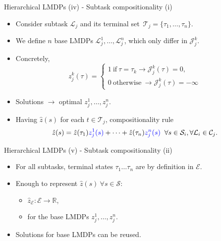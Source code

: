 \documentclass{beamer}
\theoremstyle{mystyle}
\newcommand{\cC}{\mathcal{C}}
\newcommand{\cE}{\mathcal{E}}
\newcommand{\cJ}{\mathcal{J}}
\newcommand{\cL}{\mathcal{L}}
\newcommand{\cS}{\mathcal{S}}
\newcommand{\cT}{\mathcal{T}}
\begin{document}
\begin{frame}{Hierarchical LMDPs (iv) - Subtask compositionality (i)}

\begin{itemize}
    \item Consider subtask $\cL_j$ and its terminal set~$\cT_j=\{\tau_1,\ldots,\tau_n\}$.
    \item We define {\color{blue} $n$ base LMDPs $\cL_j^1,\ldots,\cL_j^n$}, which only differ in $\cJ_j^k$.
    \item Concretely, 
    \[ 
        z_j^k(\tau)=\begin{cases}
            1 \ \text{if} \ \tau=\tau_k \rightarrow \cJ_j^k(\tau)=0,\\
            0 \ \text{otherwise} \ \rightarrow \cJ_j^k(\tau)=-\infty
        \end{cases}
    \]
    \item Solutions $\rightarrow$ {\color{blue} optimal $z_j^1,\ldots,z_j^n$.}
    \item Having $\hat z(s)$ for each $t \in \cT_j$, {\color{blue}compositionality rule}
    \begin{equation*}
        \hat{z}(s)=\hat{z}(\tau_1){\color{blue} z_j^1(s)}+\cdots+\hat{z}(\tau_n){\color{blue} z_j^n(s)} \;\; \forall s\in\cS_i,\forall\cL_i\in\cC_j.
    \end{equation*}
\end{itemize}

    
\end{frame}


\begin{frame}{Hierarchical LMDPs (v) - Subtask compositionality (ii)}


\begin{itemize}

    
   \item For all subtasks, terminal states $\tau_1 \dots \tau_n$ are by definition in $\cE$.
   \item Enough to represent $\hat z(s) \ \forall s \in \cS$:
        \begin{itemize}
            \item $\hat{z}_\cE:\cE\rightarrow\mathbb{R}$, 
            \item for the base LMDPs {\color{blue} $z_j^1,\ldots,z_j^n$}.
        \end{itemize}
   \item Solutions for base LMDPs {\color{blue} can be reused}. 
    
\end{itemize}

\end{frame}
\end{document}
